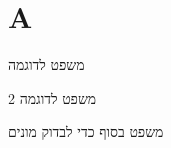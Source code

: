 
\setcounter{secnumdepth}{2}



\section{A}

\begin{theorem}
	משפט לדוגמה
\end{theorem}
\begin{theorem}
	משפט לדוגמה 2
\end{theorem}


\begin{theorem}
	משפט בסוף כדי לבדוק מונים
\end{theorem}


